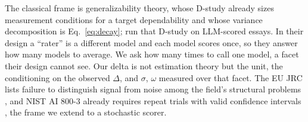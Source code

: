 The classical frame is generalizability theory, whose D-study
\citep{cronbach1972dependability, brennan2001generalizability} already sizes
measurement conditions for a target dependability and whose variance
decomposition is Eq.~\ref{eq:decay}; \citet{song2025autoscoring} run that
D-study on LLM-scored essays. In their design a ``rater'' is a different model
and each model scores once, so they answer how many models to average. We ask
how many times to call one model, a facet their design cannot see. Our
delta is not estimation theory but the unit, the conditioning on the observed
$\Delta$, and $\sigma$, $\omega$ measured over that facet. The EU JRC lists failure to distinguish signal from
noise among the field's structural problems \citep{eriksson2025trust}, and
NIST AI 800-3 already requires repeat trials with valid confidence
intervals \citep{nist2026ai8003}, the frame we extend to a stochastic
scorer.
